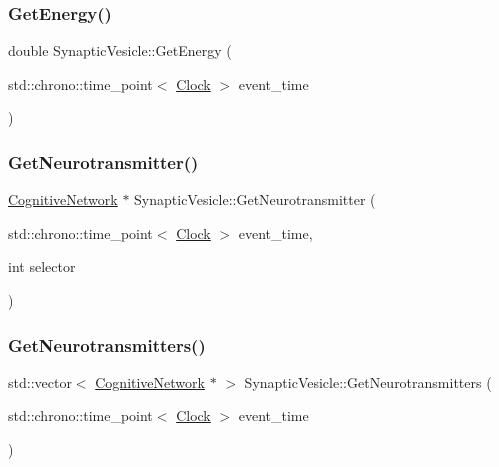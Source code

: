 \mbox{\label{classSynapticVesicle_a0c4d7e936023cf0f719d0a4d3f315c9c}} 
\subsubsection{\texorpdfstring{Get\+Energy()}{GetEnergy()}}
{\footnotesize\ttfamily double Synaptic\+Vesicle\+::\+Get\+Energy (\begin{DoxyParamCaption}\item[{std\+::chrono\+::time\+\_\+point$<$ \mbox{\hyperlink{universe_8h_a0ef8d951d1ca5ab3cfaf7ab4c7a6fd80}{Clock}} $>$}]{event\+\_\+time }\end{DoxyParamCaption})\hspace{0.3cm}{\ttfamily [inline]}}

\mbox{\label{classSynapticVesicle_a3bdf4423899d438b5a1d2246c52c8c45}} 
\subsubsection{\texorpdfstring{Get\+Neurotransmitter()}{GetNeurotransmitter()}}
{\footnotesize\ttfamily \mbox{\hyperlink{classCognitiveNetwork}{Cognitive\+Network}} $\ast$ Synaptic\+Vesicle\+::\+Get\+Neurotransmitter (\begin{DoxyParamCaption}\item[{std\+::chrono\+::time\+\_\+point$<$ \mbox{\hyperlink{universe_8h_a0ef8d951d1ca5ab3cfaf7ab4c7a6fd80}{Clock}} $>$}]{event\+\_\+time,  }\item[{int}]{selector }\end{DoxyParamCaption})}

\mbox{\label{classSynapticVesicle_ada95d85873125115208ff51f60fa72e9}} 
\subsubsection{\texorpdfstring{Get\+Neurotransmitters()}{GetNeurotransmitters()}}
{\footnotesize\ttfamily std\+::vector$<$ \mbox{\hyperlink{classCognitiveNetwork}{Cognitive\+Network}} $\ast$ $>$ Synaptic\+Vesicle\+::\+Get\+Neurotransmitters (\begin{DoxyParamCaption}\item[{std\+::chrono\+::time\+\_\+point$<$ \mbox{\hyperlink{universe_8h_a0ef8d951d1ca5ab3cfaf7ab4c7a6fd80}{Clock}} $>$}]{event\+\_\+time }\end{DoxyParamCaption})}

